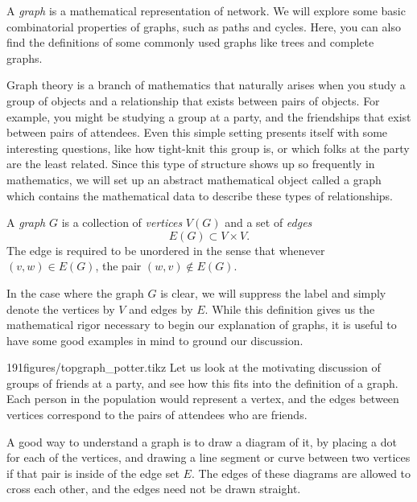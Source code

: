 \begin{elevator}	
A \emph{graph} is a mathematical representation of network. We will explore some basic combinatorial properties of graphs, such as paths and cycles. Here, you can also find the definitions of some commonly used graphs like trees and complete graphs. 
\end{elevator}%
\label{sec:graph:basic}%
Graph theory is a branch of mathematics that naturally arises when you study a group of objects and a relationship that exists between pairs of objects.
For example, you might be studying a group at a party, and the friendships that exist between pairs of attendees.
Even this simple setting presents itself with some interesting questions, like how tight-knit this group is, or which folks at the party are the least related.
Since this type of structure shows up so frequently in mathematics, we will set up an abstract mathematical object called a graph which contains the mathematical data to describe these types of relationships.
\begin{definition}[Graph]
	A \emph{graph} $G$ is a collection of \emph{vertices} $V(G)$ and a set of \emph{edges} 
	\[E(G)\subset V\times V.\]
	The edge is required to be unordered in the sense that  whenever $(v,  w)\in E(G)$,  the pair  $(w,  v)\not\in E(G)$.
\end{definition}
In the case where the graph $G$ is clear, we will suppress the label and simply denote the vertices  by $V$ and edges by $E$.
While this definition gives us the mathematical rigor necessary to begin our explanation of graphs, it is useful to have some good examples in mind to ground our discussion.
\begin{examplefigureenv}{191figures/topgraph_potter.tikz}
Let us look at the motivating discussion of groups of friends at a party, and see how this fits into the definition of a graph.
Each person in the population would represent a vertex, and the edges between vertices correspond to the pairs of attendees who are friends.
\end{examplefigureenv}

A good way to understand a graph is to draw a diagram of it, by placing a  dot for each of the vertices, and drawing a line segment or curve between two vertices if that pair is inside of the edge set $E$. 
The edges of these diagrams are allowed to cross each other, and the edges need not be drawn straight.

